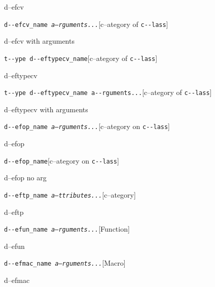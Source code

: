 \documentclass{book}
\begin{document}
%
d--efcv

\noindent\texttt{d{-}{-}efcv\_name \EmbracOn{}\textnormal{\textsl{a--rguments...}}\EmbracOff{}}\hfill[c--ategory of \texttt{c{-}{-}lass}]



%
d--efcv with arguments

\noindent\texttt{t{-}{-}ype d{-}{-}eftypecv\_name}\hfill[c--ategory of \texttt{c{-}{-}lass}]



%
d--eftypecv

\noindent\texttt{t{-}{-}ype d{-}{-}eftypecv\_name a{-}{-}rguments...}\hfill[c--ategory of \texttt{c{-}{-}lass}]



%
d--eftypecv with arguments

\noindent\texttt{d{-}{-}efop\_name \EmbracOn{}\textnormal{\textsl{a--rguments...}}\EmbracOff{}}\hfill[c--ategory on \texttt{c{-}{-}lass}]



%
d--efop

\noindent\texttt{d{-}{-}efop\_name}\hfill[c--ategory on \texttt{c{-}{-}lass}]



%
d--efop no arg

\noindent\texttt{d{-}{-}eftp\_name \EmbracOn{}\textnormal{\textsl{a--ttributes...}}\EmbracOff{}}\hfill[c--ategory]



%
d--eftp

\noindent\texttt{d{-}{-}efun\_name \EmbracOn{}\textnormal{\textsl{a--rguments...}}\EmbracOff{}}\hfill[Function]



%
d--efun

\noindent\texttt{d{-}{-}efmac\_name \EmbracOn{}\textnormal{\textsl{a--rguments...}}\EmbracOff{}}\hfill[Macro]



%
d--efmac
\end{document}
